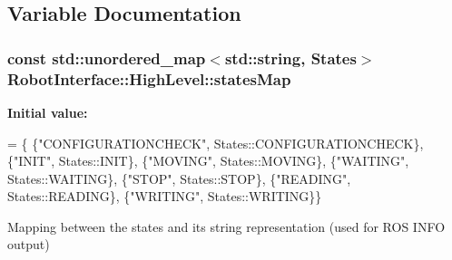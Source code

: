 \subsection{Variable Documentation}
\subsubsection[{\texorpdfstring{states\+Map}{statesMap}}]{\setlength{\rightskip}{0pt plus 5cm}const std\+::unordered\+\_\+map$<$std\+::string, {\bf States}$>$ Robot\+Interface\+::\+High\+Level\+::states\+Map}\hypertarget{namespaceRobotInterface_1_1HighLevel_ac36b1d73c7eca7c1227680406f99c9b2}{}\label{namespaceRobotInterface_1_1HighLevel_ac36b1d73c7eca7c1227680406f99c9b2}
{\bfseries Initial value\+:}
\begin{DoxyCode}
=
    \{
        \{\textcolor{stringliteral}{"CONFIGURATIONCHECK"}, States::CONFIGURATIONCHECK\},
        \{\textcolor{stringliteral}{"INIT"}, States::INIT\},
        \{\textcolor{stringliteral}{"MOVING"}, States::MOVING\},
        \{\textcolor{stringliteral}{"WAITING"}, States::WAITING\},
        \{\textcolor{stringliteral}{"STOP"}, States::STOP\},
        \{\textcolor{stringliteral}{"READING"}, States::READING\},
        \{\textcolor{stringliteral}{"WRITING"}, States::WRITING\}\}
\end{DoxyCode}
Mapping between the states and its string representation (used for R\+OS I\+N\+FO output) 